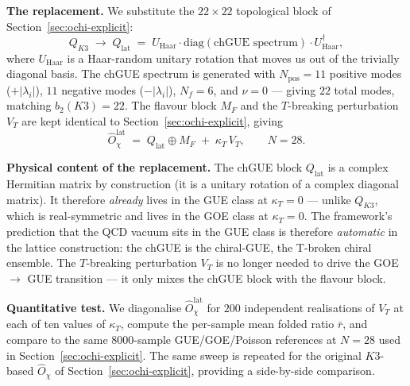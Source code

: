 \documentclass[11pt,a4paper]{article}
\newcommand{\Opchi}{\hat{O}_\chi}
\theoremstyle{plain}
\theoremstyle{definition}
\theoremstyle{remark}
\begin{document}
\medskip\noindent
\textbf{The replacement.}  We substitute the $22 \times 22$
topological block of Section~\ref{sec:ochi-explicit}:
\begin{equation}
  Q_{K3} \;\longrightarrow\;
  Q_{\mathrm{lat}} \;=\; U_{\mathrm{Haar}} \cdot
  \mathrm{diag}(\text{chGUE spectrum}) \cdot
  U_{\mathrm{Haar}}^\dagger,
\end{equation}
where $U_{\mathrm{Haar}}$ is a Haar-random unitary rotation that
moves us out of the trivially diagonal basis.  The chGUE spectrum
is generated with $N_{\mathrm{pos}} = 11$ positive modes ($+|\lambda_i|$),
$11$ negative modes ($-|\lambda_i|$), $N_f = 6$, and $\nu = 0$ ---
giving $22$ total modes, matching $b_2(K3) = 22$.  The flavour
block $M_F$ and the $T$-breaking perturbation $V_T$ are kept
identical to Section~\ref{sec:ochi-explicit}, giving
\begin{equation}
  \Opchi^{\mathrm{lat}} \;=\; Q_{\mathrm{lat}} \oplus M_F
                       \;+\; \kappa_T\, V_T,
  \qquad N = 28.
\end{equation}

\medskip\noindent
\textbf{Physical content of the replacement.}  The chGUE block
$Q_{\mathrm{lat}}$ is a complex Hermitian matrix by construction
(it is a unitary rotation of a complex diagonal matrix).  It
therefore \emph{already} lives in the GUE class at $\kappa_T = 0$
--- unlike $Q_{K3}$, which is real-symmetric and lives in the GOE
class at $\kappa_T = 0$.  The framework's prediction that the QCD
vacuum sits in the GUE class is therefore \emph{automatic} in the
lattice construction: the chGUE is the chiral-GUE, the T-broken
chiral ensemble.  The $T$-breaking perturbation $V_T$ is no
longer needed to drive the GOE $\to$ GUE transition --- it only
mixes the chGUE block with the flavour block.

\medskip\noindent
\textbf{Quantitative test.}  We diagonalise $\Opchi^{\mathrm{lat}}$
for $200$ independent realisations of $V_T$ at each of ten values
of $\kappa_T$, compute the per-sample mean folded ratio $\bar r$,
and compare to the same $8000$-sample GUE/GOE/Poisson references
at $N = 28$ used in Section~\ref{sec:ochi-explicit}.  The same
sweep is repeated for the original $K3$-based $\Opchi$ of
Section~\ref{sec:ochi-explicit}, providing a side-by-side
comparison.
\end{document}
